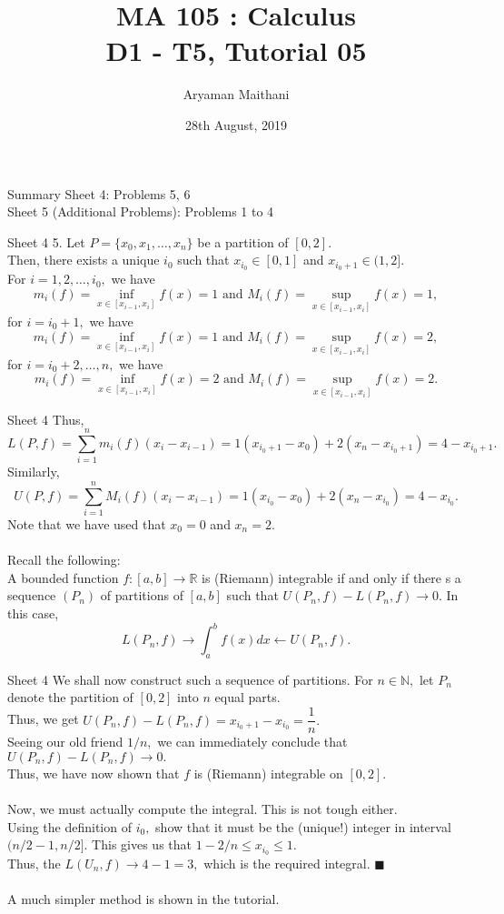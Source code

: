 \documentclass[handout, aspectratio=169]{beamer}
\title{MA 105 : Calculus\\ D1 - T5, Tutorial 05}  %
\author{Aryaman Maithani}
\date[28-08-2019]{28th August, 2019}               %
\institute[IITB]{IIT Bombay}
\begin{document}
\begin{frame}
	\titlepage
\end{frame}
\begin{frame}{Summary} 
	Sheet 4: Problems 5, 6\\	
	Sheet 5 (Additional Problems): Problems 1 to 4
\end{frame}
\begin{frame}{Sheet 4}                            %
	5. Let $P = \{x_0, x_1, \ldots, x_n\}$ be a partition of $[0, 2].$\\
	Then, there exists a unique $i_0$ such that $x_{i_0} \in [0, 1]$ and $x_{i_0 + 1} \in (1, 2].$\\
	For $i = 1, 2, \ldots, i_0,$ we have
	\[m_i(f) = \inf_{x \in [x_{i-1}, x_i]} f(x) = 1 \text{ and } M_i(f) = \sup_{x \in [x_{i-1}, x_i]}f(x) = 1,\]
	for $i = i_0 + 1,$ we have
	\[m_i(f) = \inf_{x \in [x_{i-1}, x_i]} f(x) = 1 \text{ and } M_i(f) = \sup_{x \in [x_{i-1}, x_i]}f(x) = 2,\]
	for $i = i_0 + 2, \ldots, n,$ we have
	\[m_i(f) = \inf_{x \in [x_{i-1}, x_i]} f(x) = 2 \text{ and } M_i(f) = \sup_{x \in [x_{i-1}, x_i]}f(x) = 2.\]
\end{frame}
\begin{frame}{Sheet 4}
	Thus,
	\[L(P, f) = \sum_{i=1}^{n}m_i(f)(x_i - x_{i-1}) = 1(x_{i_0 + 1} - x_0) + 2(x_n - x_{i_0 + 1}) = 4 - x_{i_0 + 1}.\]
	Similarly,
	\[U(P, f) = \sum_{i=1}^{n}M_i(f)(x_i - x_{i-1}) = 1(x_{i_0} - x_0) + 2(x_n - x_{i_0}) = 4 - x_{i_0}.\]
	Note that we have used that $x_0 = 0$ and $x_n = 2.$\\~\\
	Recall the following:\\
	A bounded function $f:[a, b] \to \mathbb{R}$ is (Riemann) integrable if and only if there s a sequence $(P_n)$ of partitions of $[a, b]$ such that $U(P_n, f) - L(P_n, f) \to 0.$ In this case,
	\[L(P_n, f) \to \int_{a}^{b} f(x) dx \leftarrow U(P_n, f).\]
	
\end{frame}
\begin{frame}{Sheet 4}
	We shall now construct such a sequence of partitions. For $n \in \mathbb{N},$ let $P_n$ denote the partition of $[0, 2]$ into $n$ equal parts.\\
	Thus, we get $U(P_n, f) - L(P_n, f) = x_{i_0 + 1} - x_{i_0} = \dfrac{1}{n}.$\\
	Seeing our old friend $1/n,$ we can immediately conclude that $U(P_n, f) - L(P_n, f) \to 0.$\\
	Thus, we have now shown that $f$ is (Riemann) integrable on $[0, 2].$\\~\\
	Now, we must actually compute the integral. This is not tough either.\\
	Using the definition of $i_0,$ show that it must be the (unique!) integer in interval $(n/2 - 1, n/2].$ This gives us that $1 - 2/n \le x_{i_0} \le 1.$\\
	Thus, the $L(U_n, f) \to 4-1 = 3,$ which is the required integral. \hfill $\blacksquare$\\~\\
	A much simpler method is shown in the tutorial.
\end{frame}
\end{document}
